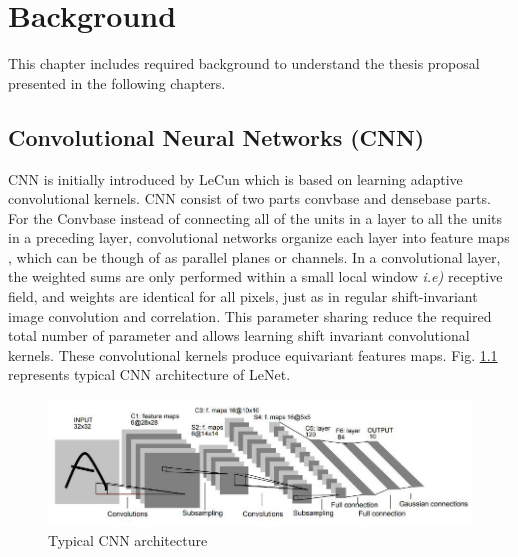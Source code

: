 
\chapter{Background} %

\label{chp:background} %

This chapter includes required background to understand the thesis proposal presented in the following chapters.

\section{Convolutional Neural Networks (CNN)}
CNN is initially introduced by LeCun \cite{lecun1989handwritten} which is based on learning adaptive convolutional kernels. CNN consist of two parts convbase and densebase parts. For the Convbase instead of connecting all of the units in a layer to all the units in a preceding layer, convolutional networks organize each layer into feature maps \cite{lecun1989handwritten}, which
can be though of as parallel planes or channels. In a convolutional layer, the weighted sums are only performed within a small local window \textit{i.e)} receptive field, and weights are identical for all pixels, just as in regular shift-invariant image convolution and correlation. This parameter sharing reduce the required total number of parameter and allows learning shift invariant convolutional kernels. These convolutional kernels produce equivariant features maps. Fig. \ref{lenet} represents typical CNN architecture of LeNet.
\begin{figure}
    \begin{center}
        \includegraphics[width=\textwidth]{Figures/LeNetCNN.jpeg}
        \caption{Typical CNN architecture}
        \label{lenet}
    \end{center}
\end{figure}
